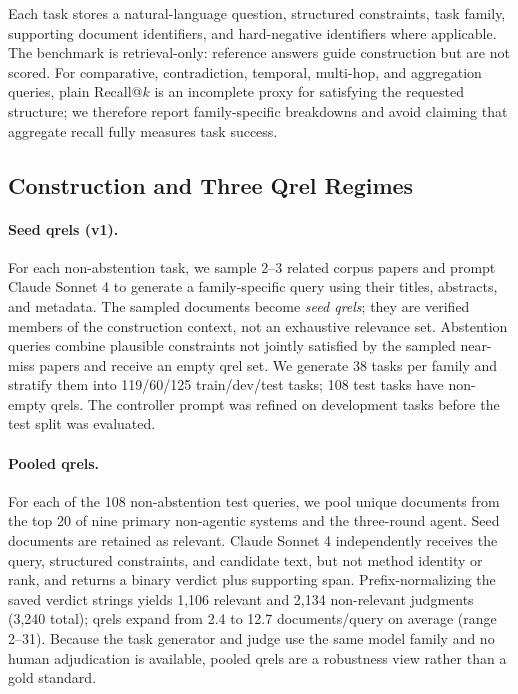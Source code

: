 \documentclass{article}
\begin{document}
Each task stores a natural-language question, structured constraints, task family, supporting document identifiers, and hard-negative identifiers where applicable. The benchmark is retrieval-only: reference answers guide construction but are not scored. For comparative, contradiction, temporal, multi-hop, and aggregation queries, plain Recall@$k$ is an incomplete proxy for satisfying the requested structure; we therefore report family-specific breakdowns and avoid claiming that aggregate recall fully measures task success.

\subsection{Construction and Three Qrel Regimes}
\label{sec:qrels}

\paragraph{Seed qrels (v1).}
For each non-abstention task, we sample 2--3 related corpus papers and prompt Claude Sonnet 4 to generate a family-specific query using their titles, abstracts, and metadata. The sampled documents become \emph{seed qrels}; they are verified members of the construction context, not an exhaustive relevance set. Abstention queries combine plausible constraints not jointly satisfied by the sampled near-miss papers and receive an empty qrel set. We generate 38 tasks per family and stratify them into 119/60/125 train/dev/test tasks; 108 test tasks have non-empty qrels. The controller prompt was refined on development tasks before the test split was evaluated.

\paragraph{Pooled qrels.}
For each of the 108 non-abstention test queries, we pool unique documents from the top 20 of nine primary non-agentic systems and the three-round agent. Seed documents are retained as relevant. Claude Sonnet 4 independently receives the query, structured constraints, and candidate text, but not method identity or rank, and returns a binary verdict plus supporting span. Prefix-normalizing the saved verdict strings yields 1,106 relevant and 2,134 non-relevant judgments (3,240 total); qrels expand from 2.4 to 12.7 documents/query on average (range 2--31). Because the task generator and judge use the same model family and no human adjudication is available, pooled qrels are a robustness view rather than a gold standard.
\end{document}
